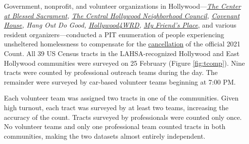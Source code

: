 \documentclass[11pt]{article}
\def\resp{respectively}
\begin{document}

\pagebreak

 Government, nonprofit, and volunteer organizations in Hollywood---{\it \href{https://thecenterinhollywood.org}
{The Center at Blessed Sacrament}, \href{https://chnc.org}{The Central Hollywood Neighborhood Council}, 
\href{https://www.covenanthouse.org/spring-meal-match?sourceid=2483460&origin=DHQEI2109EZI0N&utm_source=2103marchmealmatchweb&utm_medium=cpc&utm_campaign=FY21MarchMealMatch&utm_content=bsd2103marchmealmatchweb&gclid=CjwKCAiAp4KCBhB6EiwAxRxbpJA2yM7lM2tyAqjVALZgBGvjnhobCJJ0XmuELFDXzM5xxZ0BqyX1ChoCLi0QAvD_BwE}{Covenant House}, 
Hang Out Do Good, \href{https://hollywood4wrd.live}{Hollywood4WRD}, 
 \href{https://www.myfriendsplace.org/}{My Friend's Place}}, and various resident organizers---conducted 
a PIT enumeration of people experiencing unsheltered homelessness to compensate for 
the \href{https://laist.com/latest/post/20201209/LAHSA-cancels-2021-homeless-count-los-angeles-covid-19}
{cancellation} of the official 2021 Count. All 39 US Census tracts in the LAHSA-recognized Hollywood 
and East Hollywood communities were surveyed on 25 February (Figure \ref{fig:tcomp}). Nine tracts 
were counted by professional outreach teams during the %
day. The remainder were surveyed by car-based volunteer teams beginning at 7:00 PM.

Each volunteer team was assigned two tracts in one of the communities. Given high turnout, each tract was 
surveyed by at least two teams, increasing the accuracy of the count. Tracts 
surveyed by professionals were counted only once. No volunteer teams and only one professional team counted 
tracts in both communities, making the two datasets almost entirely independent.
\end{document}
